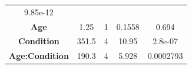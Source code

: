 \documentclass[]{article}
\theoremstyle{definition}
\theoremstyle{definition}
\theoremstyle{definition}
\theoremstyle{remark}
\begin{document}
\begin{longtable}[]{@{}ccccc@{}}
\begin{minipage}[t]{0.13\columnwidth}
9.85e-12\strut
\end{minipage}\tabularnewline
\begin{minipage}[t]{0.24\columnwidth}\centering\strut
\textbf{Age}\strut
\end{minipage} & \begin{minipage}[t]{0.11\columnwidth}\centering\strut
1.25\strut
\end{minipage} & \begin{minipage}[t]{0.06\columnwidth}\centering\strut
1\strut
\end{minipage} & \begin{minipage}[t]{0.12\columnwidth}\centering\strut
0.1558\strut
\end{minipage} & \begin{minipage}[t]{0.13\columnwidth}\centering\strut
0.694\strut
\end{minipage}\tabularnewline
\begin{minipage}[t]{0.24\columnwidth}\centering\strut
\textbf{Condition}\strut
\end{minipage} & \begin{minipage}[t]{0.11\columnwidth}\centering\strut
351.5\strut
\end{minipage} & \begin{minipage}[t]{0.06\columnwidth}\centering\strut
4\strut
\end{minipage} & \begin{minipage}[t]{0.12\columnwidth}\centering\strut
10.95\strut
\end{minipage} & \begin{minipage}[t]{0.13\columnwidth}\centering\strut
2.8e-07\strut
\end{minipage}\tabularnewline
\begin{minipage}[t]{0.24\columnwidth}\centering\strut
\textbf{Age:Condition}\strut
\end{minipage} & \begin{minipage}[t]{0.11\columnwidth}\centering\strut
190.3\strut
\end{minipage} & \begin{minipage}[t]{0.06\columnwidth}\centering\strut
4\strut
\end{minipage} & \begin{minipage}[t]{0.12\columnwidth}\centering\strut
5.928\strut
\end{minipage} & \begin{minipage}[t]{0.13\columnwidth}\centering\strut
0.0002793\strut
\end{minipage}\tabularnewline

\end{longtable}
\end{document}
